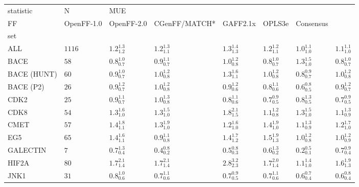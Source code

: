 \begin{tabular}{llllllll}
\toprule
statistic &       N & \multicolumn{6}{l}{MUE} \\
FF &         OpenFF-1.0 &         OpenFF-2.0 &      CGenFF/MATCH* &           GAFF2.1x &             OPLS3e &          Consensus \\
set         &         &                    &                    &                    &                    &                    &                    \\
\midrule
ALL         &  $1116$ &  $1.2_{1.2}^{1.3}$ &  $1.2_{1.1}^{1.3}$ &  $1.3_{1.3}^{1.4}$ &  $1.2_{1.1}^{1.2}$ &  $1.0_{1.0}^{1.1}$ &  $1.1_{1.0}^{1.1}$ \\
BACE        &    $58$ &  $0.8_{0.7}^{1.0}$ &  $0.9_{0.7}^{1.1}$ &  $1.0_{0.8}^{1.2}$ &  $0.8_{0.7}^{1.0}$ &  $1.3_{1.0}^{1.5}$ &  $0.8_{0.7}^{1.0}$ \\
BACE (HUNT) &    $60$ &  $0.9_{0.7}^{1.0}$ &  $1.0_{0.8}^{1.2}$ &  $1.3_{1.1}^{1.6}$ &  $1.0_{0.8}^{1.2}$ &  $0.8_{0.7}^{0.9}$ &  $1.0_{0.8}^{1.2}$ \\
BACE (P2)   &    $26$ &  $0.9_{0.7}^{1.2}$ &  $1.0_{0.8}^{1.2}$ &  $0.9_{0.6}^{1.2}$ &  $0.8_{0.6}^{1.1}$ &  $0.6_{0.5}^{0.8}$ &  $0.9_{0.7}^{1.2}$ \\
CDK2        &    $25$ &  $0.9_{0.7}^{1.1}$ &  $1.0_{0.8}^{1.3}$ &  $0.8_{0.6}^{1.1}$ &  $0.7_{0.5}^{0.9}$ &  $0.8_{0.5}^{1.3}$ &  $0.7_{0.5}^{0.9}$ \\
CDK8        &    $54$ &  $1.3_{1.0}^{1.6}$ &  $1.3_{1.0}^{1.5}$ &  $1.8_{1.5}^{2.1}$ &  $1.1_{0.8}^{1.2}$ &  $1.3_{1.0}^{1.5}$ &  $1.1_{0.9}^{1.3}$ \\
CMET        &    $57$ &  $1.4_{1.1}^{1.8}$ &  $1.3_{1.0}^{1.9}$ &  $1.2_{1.0}^{1.6}$ &  $1.4_{1.0}^{1.9}$ &  $1.1_{0.9}^{1.3}$ &  $1.2_{1.0}^{1.7}$ \\
EG5         &    $65$ &  $1.4_{1.1}^{1.6}$ &  $0.9_{0.8}^{1.1}$ &  $1.4_{1.2}^{1.7}$ &  $1.5_{1.3}^{1.9}$ &  $1.0_{0.8}^{1.2}$ &  $1.0_{0.9}^{1.2}$ \\
GALECTIN    &     $7$ &  $0.7_{0.4}^{1.3}$ &  $0.4_{0.2}^{0.8}$ &  $0.5_{0.3}^{0.8}$ &  $0.6_{0.2}^{1.3}$ &  $0.2_{0.1}^{0.5}$ &  $0.7_{0.4}^{0.9}$ \\
HIF2A       &    $80$ &  $1.7_{1.4}^{2.1}$ &  $1.7_{1.4}^{2.1}$ &  $2.8_{2.3}^{3.2}$ &  $1.7_{1.4}^{2.0}$ &  $1.1_{1.0}^{1.4}$ &  $1.6_{1.3}^{1.9}$ \\
JNK1        &    $31$ &  $0.8_{0.6}^{1.0}$ &  $0.7_{0.6}^{1.1}$ &  $0.7_{0.5}^{0.9}$ &  $0.7_{0.6}^{1.1}$ &  $0.6_{0.4}^{0.7}$ &  $0.6_{0.4}^{0.8}$ \\

\end{tabular}
